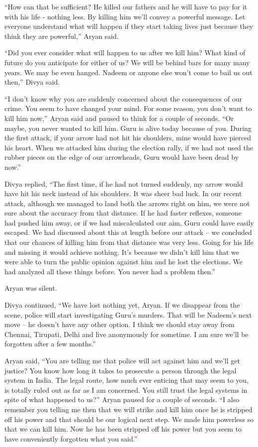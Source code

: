 “How can that be sufficient? He killed our fathers and he will have to pay for
it with his life - nothing less. By killing him we'll convey a powerful message.
Let everyone understand what will happen if they start taking lives just because
they think they are powerful,” Aryan said.

“Did you ever consider what will happen to us after we kill him? What kind of
future do you anticipate for either of us? We will be behind bars for many many
years. We may be even hanged. Nadeem or anyone else won't come to bail us out
then,” Divya said.

“I don't know why you are suddenly concerned about the consequences of our
crime. You seem to have changed your mind. For some reason, you don't want to
kill him now,” Aryan said and paused to think for a couple of seconds. “Or
maybe, you never wanted to kill him. Guru is alive today because of you. During
the first attack, if your arrow had not hit his shoulders, mine would have
pierced his heart. When we attacked him during the election rally, if we had not
used the rubber pieces on the edge of our arrowheads, Guru would have been dead
by now.”

Divya replied, “The first time, if he had not turned suddenly, my arrow would
have hit his neck instead of his shoulders. It was sheer bad luck. In our recent
attack, although we managed to land both the arrows right on him, we were not
sure about the accuracy from that distance. If he had faster reflexes, someone
had pushed him away, or if we had miscalculated our aim, Guru could have easily
escaped. We had discussed about this at length before our attack – we concluded
that our chances of killing him from that distance was very less. Going for his
life and missing it would achieve nothing. It's because we didn't kill him that
we were able to turn the public opinion against him and he lost the elections.
We had analyzed all these things before. You never had a problem then.”

Aryan was silent.

Divya continued, “We have lost nothing yet, Aryan. If we disappear from the
scene, police will start investigating Guru's murders. That will be Nadeem's
next move – he doesn't have any other option. I think we should stay away from
Chennai, Tirupati, Delhi and live anonymously for sometime. I am sure we'll be
forgotten after a few months.”

Aryan said, “You are telling me that police will act against him and we'll get
justice? You know how long it takes to prosecute a person through the legal
system in India. The legal route, how much ever enticing that may seem to you,
is totally ruled out as far as I am concerned. You still trust the legal systems
in spite of what happened to us?” Aryan paused for a couple of seconds. “I also
remember you telling me then that we will strike and kill him once he is
stripped off his power and that should be our logical next step. We made him
powerless so that we can kill him. Now he has been stripped off his power but
you seem to have conveniently forgotten what you said.”

